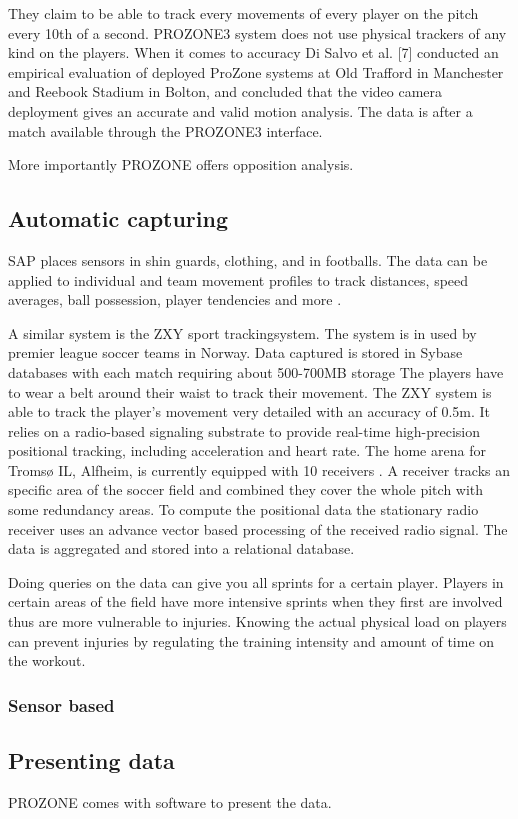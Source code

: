 They claim to be able to track every movements of every player on the pitch every 10th of a second.  PROZONE3 system does not use physical trackers of any kind on the players. When it comes to accuracy Di Salvo et al. [7] conducted an empirical evaluation of deployed ProZone systems at Old Trafford in Manchester and Reebook Stadium in Bolton, and concluded that the video camera deployment gives an accurate and valid motion analysis. The data is after a match available through the PROZONE3 interface. 

More importantly PROZONE offers opposition analysis.

\subsection{Automatic capturing}
SAP places sensors in shin guards, clothing, and in footballs. The data can be applied to individual and team movement profiles to track distances, speed averages, ball possession, player tendencies and more . 

A similar system is the ZXY sport trackingsystem. The system is in used by premier league soccer teams in Norway. Data captured is stored in Sybase databases with each match requiring about 500-700MB storage  The players have to wear a belt around their waist to track their movement. The ZXY system is able to track the player’s movement very detailed with an accuracy of 0.5m.  It relies on a radio-based signaling substrate to provide real-time high-precision positional tracking, including acceleration and heart rate. The home arena for Tromsø IL, Alfheim, is currently equipped with 10 receivers . A receiver tracks an specific area of the soccer field and combined they cover the whole pitch with some redundancy areas. To compute the positional data the stationary radio receiver uses an advance vector based processing of the received radio signal. The data is aggregated and stored into a relational database.

Doing queries on the data can give you all sprints for a certain player. Players in certain areas of the field have more intensive sprints when they first are involved thus are more vulnerable to injuries. Knowing the actual physical load on players can prevent injuries by regulating the training intensity and amount of time on the workout. 

\subsubsection{Sensor based}


\subsection{Presenting data}

PROZONE comes  with software to present the data. 